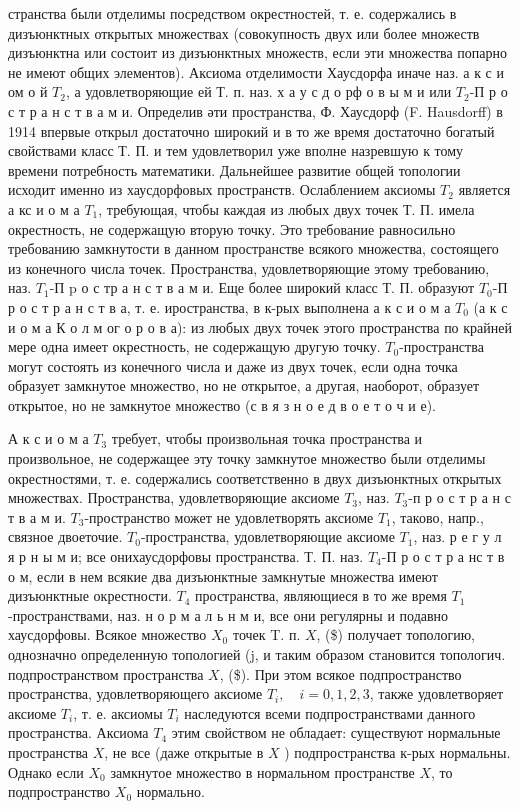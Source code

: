 \documentclass[10pt]{article}
\begin{document}
странства были отделимы посредством окрестностей, т. е. содержались в дизъюнктных открытых множествах (совокупность двух или более множеств дизъюнктна или состоит из дизъюнктных множеств, если эти множества попарно не имеют общих элементов). Аксиома отделимости Хаусдорфа иначе наз. а к с и ом о й $T_{2}$, а удовлетворяющие ей Т. п. наз. х а у с д о рф о в ы м и или $T_{2}$-П р о с т р а н с т в а м и. Определив әти пространства, Ф. Хаусдорф (F. Hausdorff) в 1914 впервые открыл достаточно широкий и в то же время достаточно богатый свойствами класс Т. П. и тем удовлетворил уже вполне назревшую к тому времени потребность математики. Дальнейшее развитие общей топологии исходит именно из хаусдорфовых пространств. Ослаблением аксиомы $T_{2}$ является а кс и о м а $T_{1}$, требующая, чтобы каждая из любых двух точек Т. П. имела окрестность, не содержащую вторую точку. Это требование равносильно требованию замкнутости в данном пространстве всякого множества, состоящего из конечного числа точек. Пространства, удовлетворяющие этому требованию, наз. $T_{1}$-П $\mathrm{p}$ о с тр а н с т в а м и. Еще более широкий класс Т. П. образуют $T_{0}$-П р о с т р а н с т в а, т. е. иространства, в к-рых выполнена а к с и о м а $T_{0}$ (а к с и о м а К о л м ог о р о в а): из любых двух точек этого пространства по крайней мере одна имеет окрестность, не содержащую другую точку. $T_{0}$-пространства могут состоять из конечного числа и даже из двух точек, если одна точка образует замкнутое множество, но не открытое, а другая, наоборот, образует открытое, но не замкнутое множество (с в я з н о е д в о е т о ч и е).



А к с и о м а $T_{3}$ требует, чтобы произвольная точка пространства и произвольное, не содержащее эту точку замкнутое множество были отделимы окрестностями, т. е. содержались соответственно в двух дизъюнктных открытых множествах. Пространства, удовлетворяющие аксиоме $T_{3}$, наз. $T_{3}$-п р о с т р а н с т в а м и. $T_{3}$-пространство может не удовлетворять аксиоме $T_{1}$, таково, напр., связное двоеточие. $T_{0}$-пространства, удовлетворяющие аксиоме $T_{1}$, наз. р е г у л я р н ы м и; все онихаусдорфовы пространства. Т. П. наз. $T_{4}$-П р о с т р а нс т в о м, если в нем всякие два дизъюнктные замкнутые множества имеют дизъюнктные окрестности. $T_{4}$ пространства, являющиеся в то же время $T_{1}$-пространствами, наз. н о р м а л ь н м и, все они регулярны и подавно хаусдорфовы. Всякое множество $X_{0}$ точек T. п. $X$, (\$) получает топологию, однозначно определенную топологией (j, и таким образом становится топологич. подпространством пространства $X$, (\$). При этом всякое подпространство пространства, удовлетворяющего аксиоме $T_{i}, \quad i=0,1,2,3$, также удовлетворяет аксиоме $T_{i}$, т. е. аксиомы $T_{i}$ наследуются всеми подпространствами данного пространства. Аксиома $T_{4}$ этим свойством не обладает: существуют нормальные пространства $X$, не все (даже открытые в $X$ ) подпространства к-рых нормальны. Однако если $X_{0}$ замкнутое множество в нормальном пространстве $X$, то подпространство $X_{0}$ нормально.
\end{document}

